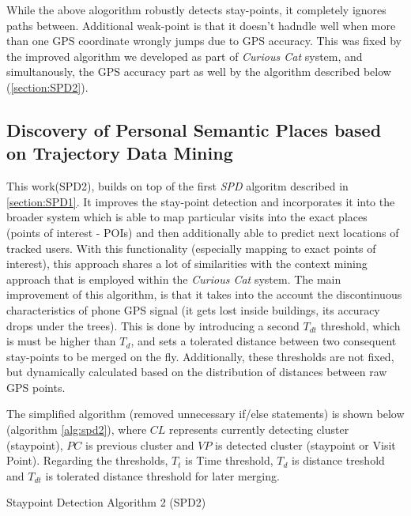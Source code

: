 While the above alogorithm robustly detects stay-points, it completely ignores
paths between. Additional weak-point is that it doesn't hadndle well when more
than one GPS coordinate wrongly jumps due to GPS accuracy. This was fixed by
the improved algorithm we developed as part of \emph{Curious Cat} system, and
simultanously, the GPS accuracy part as well by the algorithm described 
below (\autoref{section:SPD2}).

\subsection{Discovery of Personal Semantic Places based on Trajectory Data 
Mining}
\label{section:SPD2}
This work\parencite{Lv2016}(SPD2), builds on top of the first \emph{SPD} algoritm 
described in \autoref{section:SPD1}. It improves the stay-point detection and 
incorporates it into the broader system which is able to map particular visits 
into the exact places (points of interest - POIs) and then additionally able to 
predict next locations of tracked users. With this functionality (especially 
mapping to exact points of interest), this approach shares a lot of similarities
with the context mining approach that is employed within the \emph{Curious Cat} 
system. 
The main improvement of this algorithm, is that it takes into the account the
discontinuous characteristics of phone GPS signal (it gets lost inside buildings,
its accuracy drops under the trees). This is done by introducing a second
$T_{dt}$ threshold, which is must be higher than $T_d$, and sets a tolerated
distance between two consequent stay-points to be merged on the fly. 
Additionally, these thresholds are not fixed, but dynamically calculated based
on the distribution of distances between raw GPS points. 

The simplified algorithm (removed unnecessary if/else statements) is shown 
below (algorithm \ref{alg:spd2}), where $CL$
represents currently detecting cluster (staypoint), $PC$ is previous cluster and
$VP$ is detected cluster (staypoint or Visit Point). Regarding the thresholds,
$T_t$ is Time threshold, $T_d$ is distance treshold and $T_{dt}$ is tolerated
distance threshold for later merging.

\begin{algorithm}[htb]
\caption{Staypoint Detection Algorithm 2 (SPD2)}
\label{alg:spd2}

\vspace{5pt}
\vspace{5pt}
\end{algorithm}

